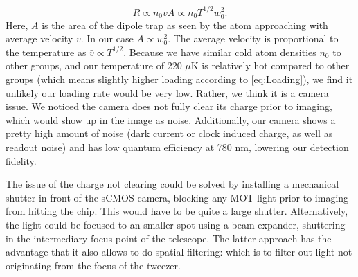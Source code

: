 \begin{equation}\label{eq:Loading}
    R \propto n_0 \bar{v} A\propto n_0 T^{1/2} w_0^2.
\end{equation}
Here, $A$ is the area of the dipole trap as seen by the atom approaching with average velocity $\bar{v}$. 
In our case $A \propto w_0^2$.
The average velocity is proportional to the temperature as $\bar{v}\propto T^{1/2}$.
Because we have similar cold atom densities $n_0$ to other groups, and our temperature of $220$ $\mu$K is relatively hot compared to other groups (which means slightly higher loading according to \cref{eq:Loading}), we find it unlikely our loading rate would be very low. 
Rather, we think it is a camera issue. 
We noticed the camera does not fully clear its charge prior to imaging, which would show up in the image as noise. 
Additionally, our camera shows a pretty high amount of noise (dark current or clock induced charge, as well as readout noise) and has low quantum efficiency at 780 nm, lowering our detection fidelity. 

The issue of the charge not clearing could be solved by installing a mechanical shutter in front of the sCMOS camera, blocking any MOT light prior to imaging from hitting the chip. 
This would have to be quite a large shutter.
Alternatively, the light could be focused to an smaller spot using a beam expander, shuttering in the intermediary focus point of the telescope. 
The latter approach has the advantage that it also allows to do spatial filtering: which is to filter out light not originating from the focus of the tweezer. 
 

